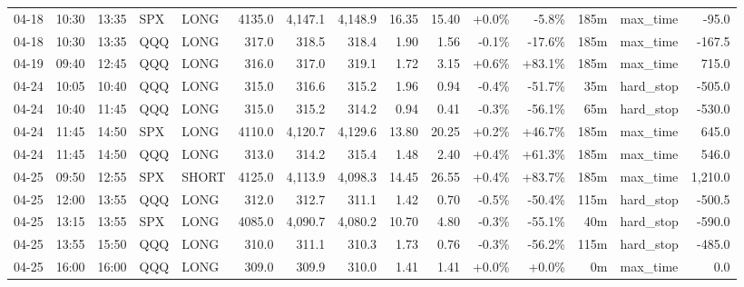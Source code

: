 \documentclass[11pt,a4paper,twoside]{article}
\begin{document}
\begin{landscape}
\begin{center}
\begin{longtable}{>{\color{txtmain}}l l l l l r r r r r r r r >{\color{txtmain}}l r}
04-18 & 10:30 & 13:35 & SPX & LONG & 4135.0 & 4,147.1 & 4,148.9 & 16.35 & 15.40 & \textcolor{wingreen}{+0.0\%} & \textcolor{lossred}{-5.8\%} & 185m & max\_time & \textcolor{lossred}{-95.0} \\
04-18 & 10:30 & 13:35 & QQQ & LONG & 317.0 & 318.5 & 318.4 & 1.90 & 1.56 & \textcolor{lossred}{-0.1\%} & \textcolor{lossred}{-17.6\%} & 185m & max\_time & \textcolor{lossred}{-167.5} \\
04-19 & 09:40 & 12:45 & QQQ & LONG & 316.0 & 317.0 & 319.1 & 1.72 & 3.15 & \textcolor{wingreen}{+0.6\%} & \textcolor{wingreen}{+83.1\%} & 185m & max\_time & \textcolor{wingreen}{715.0} \\
04-24 & 10:05 & 10:40 & QQQ & LONG & 315.0 & 316.6 & 315.2 & 1.96 & 0.94 & \textcolor{lossred}{-0.4\%} & \textcolor{lossred}{-51.7\%} & 35m & hard\_stop & \textcolor{lossred}{-505.0} \\
04-24 & 10:40 & 11:45 & QQQ & LONG & 315.0 & 315.2 & 314.2 & 0.94 & 0.41 & \textcolor{lossred}{-0.3\%} & \textcolor{lossred}{-56.1\%} & 65m & hard\_stop & \textcolor{lossred}{-530.0} \\
04-24 & 11:45 & 14:50 & SPX & LONG & 4110.0 & 4,120.7 & 4,129.6 & 13.80 & 20.25 & \textcolor{wingreen}{+0.2\%} & \textcolor{wingreen}{+46.7\%} & 185m & max\_time & \textcolor{wingreen}{645.0} \\
04-24 & 11:45 & 14:50 & QQQ & LONG & 313.0 & 314.2 & 315.4 & 1.48 & 2.40 & \textcolor{wingreen}{+0.4\%} & \textcolor{wingreen}{+61.3\%} & 185m & max\_time & \textcolor{wingreen}{546.0} \\
04-25 & 09:50 & 12:55 & SPX & SHORT & 4125.0 & 4,113.9 & 4,098.3 & 14.45 & 26.55 & \textcolor{wingreen}{+0.4\%} & \textcolor{wingreen}{+83.7\%} & 185m & max\_time & \textcolor{wingreen}{1,210.0} \\
04-25 & 12:00 & 13:55 & QQQ & LONG & 312.0 & 312.7 & 311.1 & 1.42 & 0.70 & \textcolor{lossred}{-0.5\%} & \textcolor{lossred}{-50.4\%} & 115m & hard\_stop & \textcolor{lossred}{-500.5} \\
04-25 & 13:15 & 13:55 & SPX & LONG & 4085.0 & 4,090.7 & 4,080.2 & 10.70 & 4.80 & \textcolor{lossred}{-0.3\%} & \textcolor{lossred}{-55.1\%} & 40m & hard\_stop & \textcolor{lossred}{-590.0} \\
04-25 & 13:55 & 15:50 & QQQ & LONG & 310.0 & 311.1 & 310.3 & 1.73 & 0.76 & \textcolor{lossred}{-0.3\%} & \textcolor{lossred}{-56.2\%} & 115m & hard\_stop & \textcolor{lossred}{-485.0} \\
04-25 & 16:00 & 16:00 & QQQ & LONG & 309.0 & 309.9 & 310.0 & 1.41 & 1.41 & \textcolor{wingreen}{+0.0\%} & \textcolor{wingreen}{+0.0\%} & 0m & max\_time & \textcolor{wingreen}{0.0} \\

\end{longtable}
\end{center}
\end{landscape}
\end{document}
